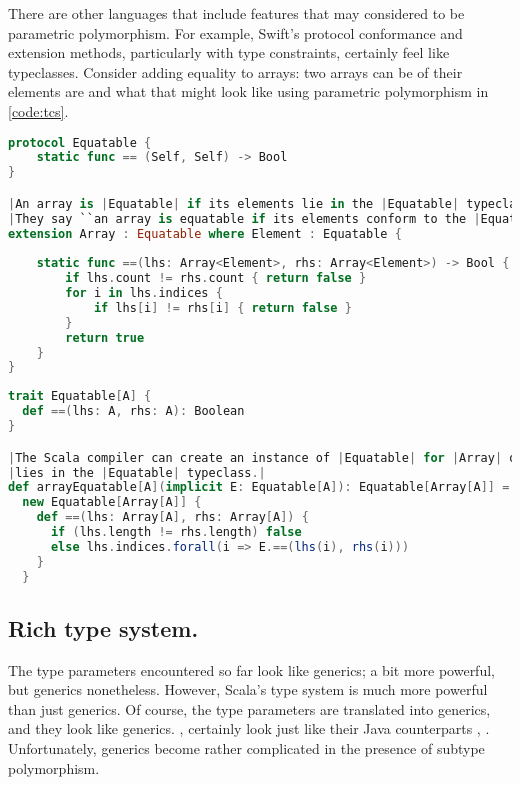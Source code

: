 \documentclass[10 pt]{article}
\begin{document}
There are other languages that include features that may considered to be parametric polymorphism. For example, Swift's protocol conformance and extension methods, particularly with type constraints, certainly feel like typeclasses. Consider adding equality to arrays: two arrays can be  of their elements are  and what that might look like using parametric polymorphism in \autoref{code:tcs}.

\begin{lstlisting}[language=Swift, escapechar=|]
protocol Equatable {
    static func == (Self, Self) -> Bool
}

|An array is |Equatable| if its elements lie in the |Equatable| typeclass. No, wait, that's not what Swift programmers say.|
|They say ``an array is equatable if its elements conform to the |Equatable| protocol''.|
extension Array : Equatable where Element : Equatable {
    
    static func ==(lhs: Array<Element>, rhs: Array<Element>) -> Bool {
        if lhs.count != rhs.count { return false }
        for i in lhs.indices {
            if lhs[i] != rhs[i] { return false }
        }
        return true
    }
}
\end{lstlisting}
\begin{lstlisting}[caption={Extension methods and protocol conformance}, label={code:tcs}, language=Scala, escapechar=|]
trait Equatable[A] {
  def ==(lhs: A, rhs: A): Boolean
}

|The Scala compiler can create an instance of |Equatable| for |Array| of elements of type |A| as long as the type |A
|lies in the |Equatable| typeclass.|
def arrayEquatable[A](implicit E: Equatable[A]): Equatable[Array[A]] = 
  new Equatable[Array[A]] {
    def ==(lhs: Array[A], rhs: Array[A]) {
      if (lhs.length != rhs.length) false 
      else lhs.indices.forall(i => E.==(lhs(i), rhs(i)))
    }
  }
\end{lstlisting}

\subsection{Rich type system.}
The type parameters encountered so far look like generics; a bit more powerful, but generics nonetheless. However, Scala's type system is much more powerful than just generics. Of course, the type parameters are translated into generics, and they look like generics. ,  certainly look just like their Java counterparts , . Unfortunately, generics become rather complicated in the presence of subtype polymorphism. 
\end{document}
